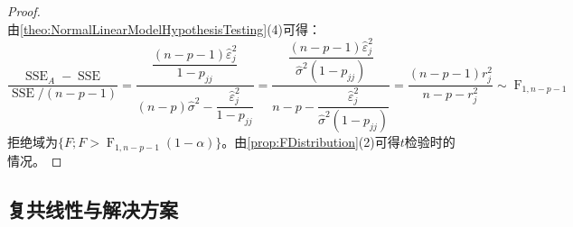 \begin{proof}
\begin{equation*}
	\end{equation*}
	由\cref{theo:NormalLinearModelHypothesisTesting}(4)可得：
	\begin{equation*}
		\frac{\operatorname{SSE}_A-\operatorname{SSE}}{\operatorname{SSE}/(n-p-1)}=\dfrac{\dfrac{(n-p-1)\hat{\varepsilon}_j^2}{1-p_{jj}}}{(n-p)\hat{\sigma}^2-\dfrac{\hat{\varepsilon}_j^2}{1-p_{jj}}}=\dfrac{\dfrac{(n-p-1)\hat{\varepsilon}_j^2}{\hat{\sigma}^2(1-p_{jj})}}{n-p-\dfrac{\hat{\varepsilon}_j^2}{\hat{\sigma}^2(1-p_{jj})}}=\frac{(n-p-1)r_j^2}{n-p-r_j^2}\sim\operatorname{F}_{1,n-p-1}
	\end{equation*}
	拒绝域为$\{F;F>\operatorname{F}_{1,n-p-1}(1-\alpha)\}$。由\cref{prop:FDistribution}(2)可得$t$检验时的情况。
\end{proof}

\subsection{复共线性与解决方案}
